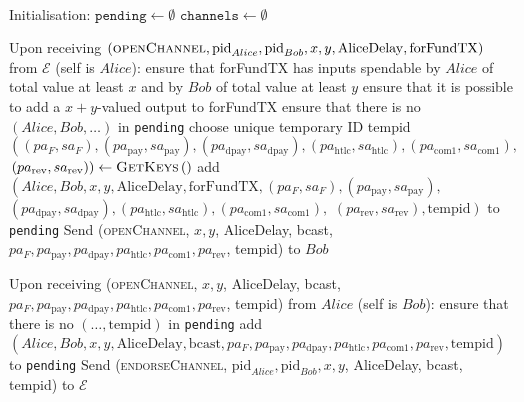 \ \\ 
  \label{alg:lightningprot}
  \begin{algorithmic}[1]
    \State Initialisation:
    \Indent
      \State $\mathtt{pending} \gets \emptyset$
      \State $\mathtt{channels} \gets \emptyset$
    \EndIndent
    \State

    \State Upon receiving $\left(\textsc{openChannel}, \mathrm{pid}_{Alice},
    \mathrm{pid}_{Bob}, x, y, \mathrm{AliceDelay}, \mathrm{forFundTX}\right)$
    from $\mathcal{E}$ (self is $Alice$):
    \Indent
      \State ensure that forFundTX has inputs spendable by $Alice$ of total
      value at least $x$ and by $Bob$ of total value at least $y$
      \State ensure that it is possible to add a $x + y$-valued output to
      forFundTX
      \State {}
      \State ensure that there is no $\left(Alice, Bob, \dots\right)$
      in \texttt{pending}
      \State choose unique temporary ID tempid
      \State $\left(\left(pa_F, sa_F\right), \left(pa_{\mathrm{pay}},
      sa_{\mathrm{pay}}\right), \left(pa_{\mathrm{dpay}},
      sa_{\mathrm{dpay}}\right), \left(pa_{\mathrm{htlc}},
      sa_{\mathrm{htlc}}\right), \left(pa_{\mathrm{com}1},
      sa_{\mathrm{com}1}\right),\right.$ $\left.\left(pa_{\mathrm{rev}},
      sa_{\mathrm{rev}}\right)\right) \gets \textsc{GetKeys}\left(\right)$
      \State add $\left(Alice, Bob, x, y, \mathrm{AliceDelay},
      \mathrm{forFundTX}, \left(pa_F, sa_F\right), \left(pa_{\mathrm{pay}},
      sa_{\mathrm{pay}}\right),\right.$ $\left.\left(pa_{\mathrm{dpay}},
      sa_{\mathrm{dpay}}\right), \left(pa_{\mathrm{htlc}},
      sa_{\mathrm{htlc}}\right), \left(pa_{\mathrm{com}1},
      sa_{\mathrm{com}1}\right),\right.$ $\left.\left(pa_{\mathrm{rev}},
      sa_{\mathrm{rev}}\right), \mathrm{tempid}\right)$ to \texttt{pending}
      \State Send (\textsc{openChannel}, $x, y$, AliceDelay, bcast, $pa_F,
      pa_{\mathrm{pay}}, pa_{\mathrm{dpay}}, pa_{\mathrm{htlc}},
      pa_{\mathrm{com}1}, pa_{\mathrm{rev}}$, tempid) to $Bob$
    \EndIndent
    \State

    \State Upon receiving (\textsc{openChannel}, $x, y$, AliceDelay, bcast,
    $pa_F, pa_{\mathrm{pay}}, pa_{\mathrm{dpay}}, pa_{\mathrm{htlc}},
    pa_{\mathrm{com}1}, pa_{\mathrm{rev}}$, tempid) from $Alice$ (self is
    $Bob$):
    \Indent
      \State ensure that there is no $\left(\dots, \mathrm{tempid}\right)$ in
      \texttt{pending}
      \State add $\left(Alice, Bob, x, y, \mathrm{AliceDelay}, \mathrm{bcast},
      pa_F, pa_{\mathrm{pay}}, pa_{\mathrm{dpay}}, pa_{\mathrm{htlc}},
      pa_{\mathrm{com}1}, pa_{\mathrm{rev}}, \mathrm{tempid}\right)$ to
      \texttt{pending}
      \State Send (\textsc{endorseChannel}, $\mathrm{pid}_{Alice},
      \mathrm{pid}_{Bob}, x, y$, AliceDelay, bcast, tempid) to $\mathcal{E}$
    \EndIndent
    \State


\end{algorithmic}
